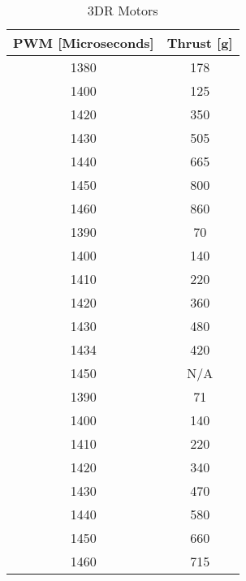 \newpage
\begin {table}[H]
    \begin{center}
    \caption {3DR Motors} 
    \label{tab:tabt2} 
    \begin{tabular}{|c|c|}\hline 
\textbf{PWM [Microseconds]} & \textbf{Thrust [g]}\\
\hline 
1380 & 178 \\
1400 & 125 \\
1420 & 350 \\
1430 & 505 \\
1440 & 665 \\
1450 & 800 \\
1460 & 860 \\
1390 & 70 \\
1400 & 140 \\
1410 & 220 \\
1420 & 360 \\
1430 & 480 \\
1434 & 420 \\
1450 & N/A \\
1390 & 71 \\
1400 & 140 \\
1410 & 220 \\
1420 & 340 \\
1430 & 470 \\
1440 & 580 \\
1450 & 660 \\
1460 & 715 \\
        \hline 
    \end{tabular}
    \end{center}
\end{table}